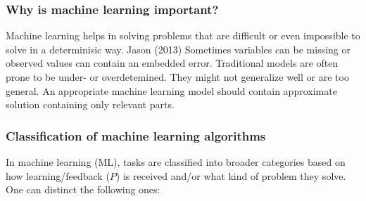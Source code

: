 \documentclass[]{article}
\begin{document}
\subsubsection{Why is machine learning
important?}\label{why-is-machine-learning-important}

Machine learning helps in solving problems that are difficult or even
impossible to solve in a determinisic way. Jason (2013) Sometimes
variables can be missing or observed values can contain an embedded
error. Traditional models are often prone to be under- or overdetemined.
They might not generalize well or are too general. An appropriate
machine learning model should contain approximate solution containing
only relevant parts.

\subsubsection{Classification of machine learning
algorithms}\label{classification-of-machine-learning-algorithms}

In machine learning (ML), tasks are classified into broader categories
based on how learning/feedback (\(P\)) is received and/or what kind of
problem they solve. One can distinct the following ones:
\end{document}
